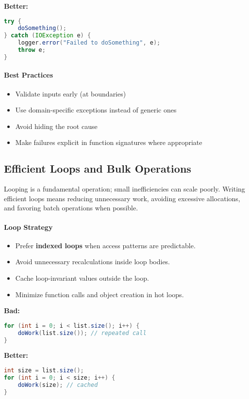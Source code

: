 \documentclass[a4paper,12pt]{article}
\begin{document}
\textbf{Better:}
\begin{lstlisting}[language=Java]
try {
    doSomething();
} catch (IOException e) {
    logger.error("Failed to doSomething", e);
    throw e;
}
\end{lstlisting}

\paragraph{Best Practices}
\begin{itemize}
  \item Validate inputs early (at boundaries)
  \item Use domain-specific exceptions instead of generic ones
  \item Avoid hiding the root cause
  \item Make failures explicit in function signatures where appropriate
\end{itemize}

\subsection{Efficient Loops and Bulk Operations}

Looping is a fundamental operation; small inefficiencies can scale poorly. Writing efficient loops means reducing unnecessary work, avoiding excessive allocations, and favoring batch operations when possible.

\paragraph{Loop Strategy}

\begin{itemize}
  \item Prefer \textbf{indexed loops} when access patterns are predictable.
  \item Avoid unnecessary recalculations inside loop bodies.
  \item Cache loop-invariant values outside the loop.
  \item Minimize function calls and object creation in hot loops.
\end{itemize}

\textbf{Bad:}
\begin{lstlisting}[language=Java]
for (int i = 0; i < list.size(); i++) {
    doWork(list.size()); // repeated call
}
\end{lstlisting}

\textbf{Better:}
\begin{lstlisting}[language=Java]
int size = list.size();
for (int i = 0; i < size; i++) {
    doWork(size); // cached
}
\end{lstlisting}
\end{document}
